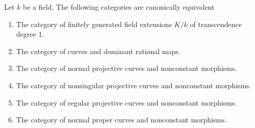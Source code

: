 %
\begin{theorem}
\label{theorem-curves-rational-maps}
Let $k$ be a field. The following categories are canonically equivalent
\begin{enumerate}
\item The category of finitely generated field extensions $K/k$ of
transcendence degree $1$.
\item The category of curves and dominant rational maps.
\item The category of normal projective curves and nonconstant morphisms.
\item The category of nonsingular projective curves and nonconstant morphisms.
\item The category of regular projective curves and nonconstant morphisms.
\item The category of normal proper curves and nonconstant morphisms.
\end{enumerate}
\end{theorem}

